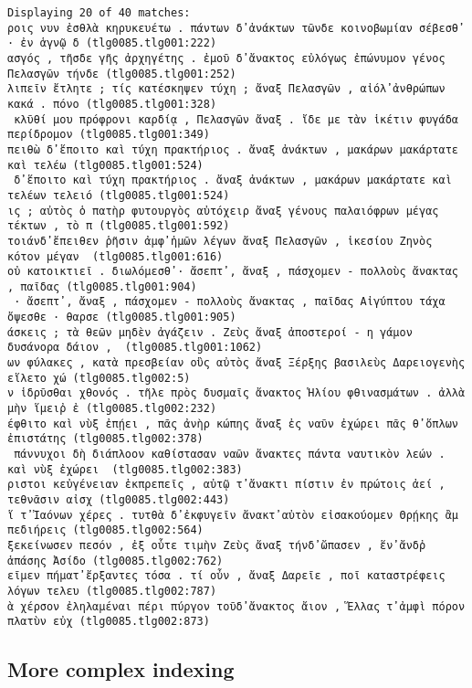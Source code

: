 \documentclass[11pt]{article}
\begin{document}
    \begin{Verbatim}[commandchars=\\\{\}]
Displaying 20 of 40 matches:
ροις νυν ἐσθλὰ κηρυκευέτω . πάντων δ̓ ἀνάκτων τῶνδε κοινοβωμίαν σέβεσθ̓ · ἐν ἁγνῷ δ (tlg0085.tlg001:222)
ασγός , τῆσδε γῆς ἀρχηγέτης . ἐμοῦ δ̓ ἄνακτος εὐλόγως ἐπώνυμον γένος Πελασγῶν τήνδε (tlg0085.tlg001:252)
λιπεῖν ἔτλητε ; τίς κατέσκηψεν τύχη ; ἄναξ Πελασγῶν , αἰόλ̓ ἀνθρώπων κακά . πόνο (tlg0085.tlg001:328)
 κλῦθί μου πρόφρονι καρδίᾳ , Πελασγῶν ἄναξ . ἴδε με τὰν ἱκέτιν φυγάδα περίδρομον (tlg0085.tlg001:349)
πειθὼ δ̓ ἕποιτο καὶ τύχη πρακτήριος . ἄναξ ἀνάκτων , μακάρων μακάρτατε καὶ τελέω (tlg0085.tlg001:524)
 δ̓ ἕποιτο καὶ τύχη πρακτήριος . ἄναξ ἀνάκτων , μακάρων μακάρτατε καὶ τελέων τελειό (tlg0085.tlg001:524)
ις ; αὐτὸς ὁ πατὴρ φυτουργὸς αὐτόχειρ ἄναξ γένους παλαιόφρων μέγας τέκτων , τὸ π (tlg0085.tlg001:592)
τοιάνδ̓ ἔπειθεν ῥῆσιν ἀμφ̓ ἡμῶν λέγων ἄναξ Πελασγῶν , ἱκεσίου Ζηνὸς κότον μέγαν  (tlg0085.tlg001:616)
οὐ κατοικτιεῖ . διωλόμεσθ̓ · ἄσεπτ̓ , ἄναξ , πάσχομεν - πολλοὺς ἄνακτας , παῖδας (tlg0085.tlg001:904)
 · ἄσεπτ̓ , ἄναξ , πάσχομεν - πολλοὺς ἄνακτας , παῖδας Αἰγύπτου τάχα ὄψεσθε · θαρσε (tlg0085.tlg001:905)
άσκεις ; τὰ θεῶν μηδὲν ἀγάζειν . Ζεὺς ἄναξ ἀποστεροί - η γάμον δυσάνορα δάιον ,  (tlg0085.tlg001:1062)
ων φύλακες , κατὰ πρεσβείαν οὓς αὐτὸς ἄναξ Ξέρξης βασιλεὺς Δαρειογενὴς εἵλετο χώ (tlg0085.tlg002:5)
ν ἱδρῦσθαι χθονός . τῆλε πρὸς δυσμαῖς ἄνακτος Ἡλίου φθινασμάτων . ἀλλὰ μὴν ἵμειῤ ἐ (tlg0085.tlg002:232)
έφθιτο καὶ νὺξ ἐπῄει , πᾶς ἀνὴρ κώπης ἄναξ ἐς ναῦν ἐχώρει πᾶς θ̓ ὅπλων ἐπιστάτης (tlg0085.tlg002:378)
 πάννυχοι δὴ διάπλοον καθίστασαν ναῶν ἄνακτες πάντα ναυτικὸν λεών . καὶ νὺξ ἐχώρει  (tlg0085.tlg002:383)
ριστοι κεὐγένειαν ἐκπρεπεῖς , αὐτῷ τ̓ ἄνακτι πίστιν ἐν πρώτοις ἀεί , τεθνᾶσιν αἰσχ (tlg0085.tlg002:443)
ἵ τ̓ Ἰαόνων χέρες . τυτθὰ δ̓ ἐκφυγεῖν ἄνακτ̓ αὐτὸν εἰσακούομεν Θρῄκης ἂμ πεδιήρεις (tlg0085.tlg002:564)
ξεκείνωσεν πεσόν , ἐξ οὗτε τιμὴν Ζεὺς ἄναξ τήνδ̓ ὤπασεν , ἕν̓ ἄνδῤ ἁπάσης Ἀσίδο (tlg0085.tlg002:762)
εῖμεν πήματ̓ ἔρξαντες τόσα . τί οὖν , ἄναξ Δαρεῖε , ποῖ καταστρέφεις λόγων τελευ (tlg0085.tlg002:787)
ὰ χέρσον ἐληλαμέναι πέρι πύργον τοῦδ̓ ἄνακτος ἄιον , Ἕλλας τ̓ ἀμφὶ πόρον πλατὺν εὐχ (tlg0085.tlg002:873)

    \end{Verbatim}

    \subsection{More complex indexing}\label{more-complex-indexing}
\end{document}
